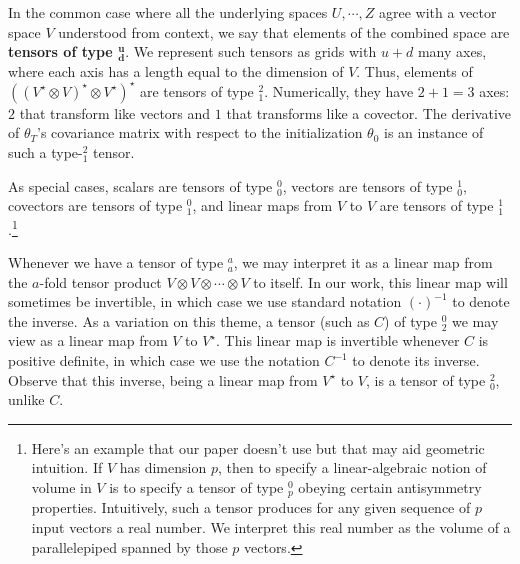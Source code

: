             In the common case where all the underlying spaces $U,\cdots, Z$
            agree with a vector space $V$ understood from
            context, we say that elements of the combined space are
            \textbf{tensors of type $\mathbf{^u_d}$}.  We represent such
            tensors as grids with $u+d$ many axes, where each axis has a length
            equal to the dimension of $V$.
            Thus, elements of $((V^\star \otimes V)^\star \otimes
            V^\star)^\star$ are tensors of type $^2_1$.  Numerically, they have
            $2+1=3$ axes: $2$ that transform like vectors and $1$ that
            transforms like a covector.  
            The derivative of $\theta_T$'s covariance matrix with respect to
            the initialization $\theta_0$ is an instance of such a type-$^2_1$
            tensor.

            As special cases, scalars are tensors of type $^0_0$,
            vectors are tensors of type $^1_0$, covectors are tensors of
            type $^0_1$, and linear maps from $V$ to $V$ are tensors of type
            $^1_1$.\footnote{
                Here's an example that our paper doesn't use but that may
                aid geometric intuition.
                If $V$ has dimension $p$, then to specify a linear-algebraic
                notion of volume in $V$ is to specify a tensor of type $^0_p$
                obeying certain antisymmetry properties.
                Intuitively, such a tensor produces for any given sequence
                of $p$ input vectors a real number.  We interpret this real
                number as the volume of a parallelepiped spanned by those $p$
                vectors.
            }

            Whenever we have a tensor of type $^a_a$, we may interpret it as a
            linear map from the $a$-fold tensor product $V\otimes
            V\otimes\cdots\otimes V$ to itself.  In our work, this linear map  
            will sometimes be invertible, in which case we use standard notation
            $(\cdot)^{-1}$ to denote the inverse.
            As a variation on this theme, a tensor (such as $C$) of type
            $^0_2$ we may view as a linear map from $V$ to $V^\star$.
            This linear map  
            is invertible whenever $C$ is positive definite, in which case
            we use the notation $C^{-1}$ to denote its inverse.  Observe that
            this inverse, being a linear map from $V^\star$ to $V$, is a tensor
            of type $^2_0$, unlike $C$.

